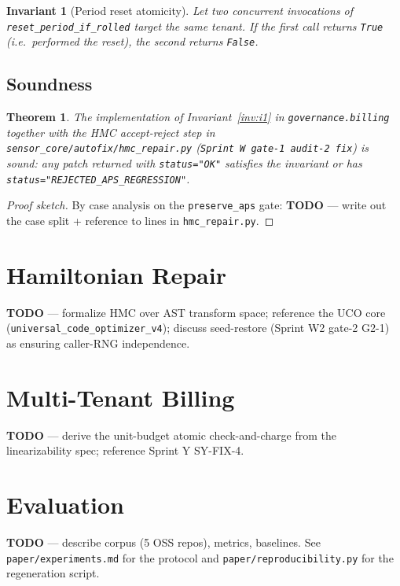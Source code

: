 \documentclass[acmsmall, screen]{acmart}
\newtheorem{invariant}{Invariant}
\newtheorem{theorem}{Theorem}
\begin{document}
\begin{invariant}[Period reset atomicity]
\label{inv:i5}
Let two concurrent invocations of \texttt{reset\_period\_if\_rolled}
target the same tenant.  If the first call returns \texttt{True}
(i.e.\ performed the reset), the second returns \texttt{False}.
\end{invariant}

\subsection{Soundness}

\begin{theorem}
\label{thm:i1-soundness}
The implementation of Invariant~\ref{inv:i1} in
\texttt{governance.billing} together with the HMC accept-reject step
in \texttt{sensor\_core/autofix/hmc\_repair.py} (\texttt{Sprint W
gate-1 audit-2 fix}) is sound: any patch returned with
\texttt{status="OK"} satisfies the invariant or has
\texttt{status="REJECTED\_APS\_REGRESSION"}.
\end{theorem}

\begin{proof}[Proof sketch]
By case analysis on the \texttt{preserve\_aps} gate:
\textbf{TODO} — write out the case split + reference to lines
in \texttt{hmc\_repair.py}.
\end{proof}

\section{Hamiltonian Repair}
\label{sec:hmc}

\textbf{TODO} — formalize HMC over AST transform space; reference
the UCO core (\texttt{universal\_code\_optimizer\_v4}); discuss
seed-restore (Sprint W2 gate-2 G2-1) as ensuring caller-RNG
independence.

\section{Multi-Tenant Billing}
\label{sec:tenancy}

\textbf{TODO} — derive the unit-budget atomic check-and-charge from
the linearizability spec; reference Sprint Y SY-FIX-4.

\section{Evaluation}
\label{sec:eval}

\textbf{TODO} — describe corpus (5 OSS repos), metrics, baselines.
See \texttt{paper/experiments.md} for the protocol and
\texttt{paper/reproducibility.py} for the regeneration script.
\end{document}

